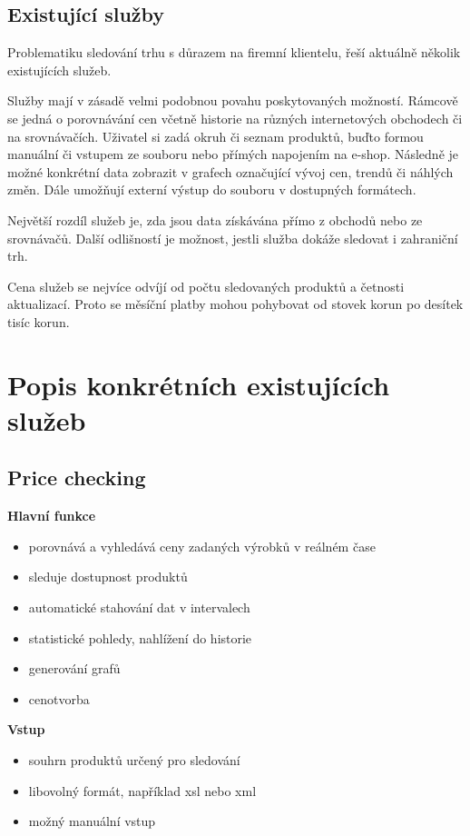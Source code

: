 \documentclass[thesis=B,czech]{FITthesis}[2012/06/26]
\begin{document}
\subsection{Existující služby}

Problematiku sledování trhu s důrazem na firemní klientelu, řeší aktuálně několik existujících služeb.
\par
Služby mají v zásadě velmi podobnou povahu poskytovaných možností. Rámcově se jedná o porovnávání cen včetně historie na různých internetových
obchodech či na srovnávačích. Uživatel si zadá okruh či seznam produktů, buďto formou manuální či vstupem ze souboru nebo 
přímých napojením na e-shop. Následně je možné konkrétní data zobrazit v grafech označující vývoj cen, trendů či náhlých změn.
Dále umožňují externí výstup do souboru v dostupných formátech.
\par
Největší rozdíl služeb je, zda jsou data získávána přímo z obchodů nebo ze srovnávačů. Další odlišností je 
možnost, jestli služba dokáže sledovat i zahraniční trh.
\par
Cena služeb se nejvíce odvíjí od počtu sledovaných produktů a četnosti aktualizací. Proto se měsíční platby mohou 
pohybovat od stovek korun po desítek tisíc korun.

\section{Popis konkrétních existujících služeb}

\subsection{Price checking\cite{priceChecking}} 


\textbf{Hlavní funkce}
\begin{itemize}
\item porovnává a vyhledává ceny zadaných výrobků v reálném čase
\item sleduje dostupnost produktů
\item automatické stahování dat v intervalech
\item statistické pohledy, nahlížení do historie
\item generování grafů
\item cenotvorba
\end{itemize}

\textbf{Vstup}
\begin{itemize}
\item souhrn produktů určený pro sledování
\item libovolný formát, například xsl nebo xml
\item možný manuální vstup
\end{itemize}
\end{document}
